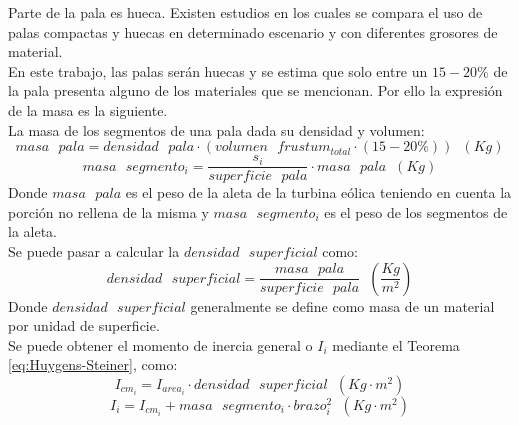 Parte de la pala es hueca. Existen estudios \cite{Pourrajabian2016} en los cuales se compara el uso de palas compactas y huecas en determinado escenario y con diferentes grosores de material. \\

En este trabajo, las palas serán huecas y se estima que solo entre un $15-20\%$ de la pala presenta alguno de los materiales que se mencionan. Por ello la expresión de la masa es la siguiente. \\

La masa de los segmentos de una pala dada su densidad y volumen:
 \begin{equation}
 masa \text{ } pala = densidad \text{ } pala \cdot (volumen \text{ } frustum_{total} \cdot (15-20\%) ) \hspace{7pt} (Kg)
 \end{equation}
 \begin{equation}
 masa \text{ } segmento_i = \dfrac{s_i}{superficie \text{ } pala} \cdot masa \text{ } pala \hspace{7pt} (Kg)
 \label{def:masa_pala} 
 \end{equation}
  Donde $ masa \text{ } pala $ es el peso de la aleta de la turbina eólica teniendo en cuenta la porción no rellena de la misma y $ masa \text{ } segmento_i $ es el peso de los segmentos de la aleta.\\
 
Se puede pasar a calcular la $densidad \text{ } superficial$ como:
  \begin{equation}
 densidad \text{ } superficial = \dfrac{masa \text{ } pala}{ superficie \text{ } pala} \hspace{7pt} \left(\dfrac{Kg}{m^2}\right)
 \label{def:densidad_superficial}
 \end{equation}
 Donde $ densidad \text{ } superficial $ generalmente se define como masa de un material por unidad de superficie. \\
 
Se puede obtener el momento de inercia general o $I_i$ mediante el Teorema \ref{eq:Huygens-Steiner}, como:
  \begin{equation}
I_{cm_i} = I_{area_i} \cdot densidad \text{ } superficial \hspace{7pt} (Kg \cdot m^2)
 \label{def:momento_inercia_cm}
 \end{equation}
 \begin{equation}
I_i = I_{cm_i} + masa \text{ } segmento_i \cdot brazo_i^2 \hspace{7pt} (Kg \cdot m^2)
 \label{def:momento_inercia_general}
 \end{equation}

